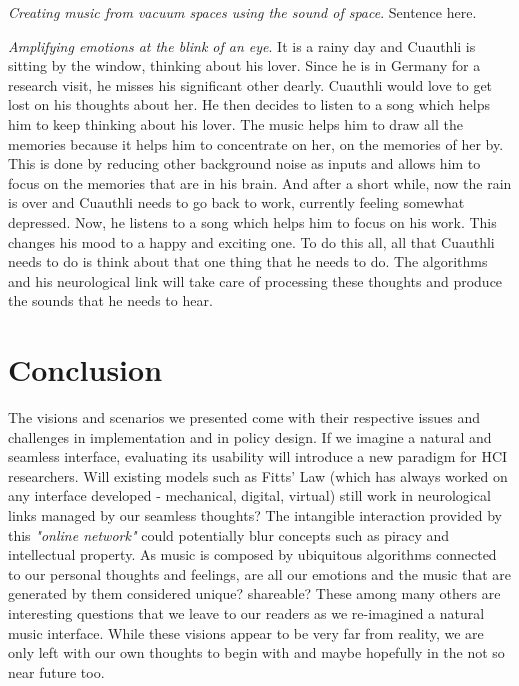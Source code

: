 \documentclass[sigchi]{acmart}
\begin{document}
\textit{Creating music from vacuum spaces using the sound of space}. Sentence here. 

\textit{Amplifying emotions at the blink of an eye}. It is a rainy day and Cuauthli is sitting by the window, thinking about his lover. Since he is in Germany for a research visit, he misses his significant other dearly. Cuauthli would love to get lost on his thoughts about her. He then decides to listen to a song which helps him to keep thinking about his lover. The music helps him to draw all the memories because it helps him to concentrate on her, on the memories of her by. This is done by reducing other background noise as inputs and allows him to focus on the memories that are in his brain. And after a short while,  now the rain is over and Cuauthli needs to go back to work, currently feeling somewhat depressed. Now,  he listens to a song which helps him to focus on his work. This changes his mood to a happy and exciting one. To do this all, all that Cuauthli needs to do is think about that one thing that he needs to do. The algorithms and his neurological link will take care of processing these thoughts and produce the sounds that he needs to hear. 

\section{Conclusion}
The visions and scenarios we presented come with their respective issues and challenges in implementation and in policy design. If we imagine a natural and seamless interface, evaluating its usability will introduce a new paradigm for HCI researchers. Will existing models such as Fitts' Law (which has always worked on any interface developed - mechanical, digital, virtual) still work in neurological links managed by our seamless thoughts? The intangible interaction provided by this \textit{"online network"} could potentially blur concepts such as piracy and intellectual property. As music is composed by ubiquitous algorithms connected to our personal thoughts and feelings, are all our emotions and the music that are generated by them considered unique? shareable? These among many others are interesting questions that we leave to our readers as we re-imagined a natural music interface. While these visions appear to be very far from reality, we are only left with our own thoughts to begin with and maybe hopefully in the not so near future too. 





\end{document}
